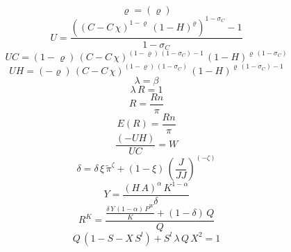 \begin{dmath}
{{\varrho}}=({{\varrho}})
\end{dmath}
\begin{dmath}
{U}=\frac{\left(\left({C}-{C}\, {{\chi}}\right)^{1-{{\varrho}}}\, \left(1-{H}\right)^{{{\varrho}}}\right)^{1-{{\sigma_{C}}}}-1}{1-{{\sigma_{C}}}}
\end{dmath}
\begin{dmath}
{UC}=\left(1-{{\varrho}}\right)\, \left({C}-{C}\, {{\chi}}\right)^{\left(1-{{\varrho}}\right)\, \left(1-{{\sigma_{C}}}\right)-1}\, \left(1-{H}\right)^{{{\varrho}}\, \left(1-{{\sigma_{C}}}\right)}
\end{dmath}
\begin{dmath}
{UH}=\left(-{{\varrho}}\right)\, \left({C}-{C}\, {{\chi}}\right)^{\left(1-{{\varrho}}\right)\, \left(1-{{\sigma_{C}}}\right)}\, \left(1-{H}\right)^{{{\varrho}}\, \left(1-{{\sigma_{C}}}\right)-1}
\end{dmath}
\begin{dmath}
{\lambda}={{\beta}}
\end{dmath}
\begin{dmath}
{\lambda}\, {R}=1
\end{dmath}
\begin{dmath}
{R}=\frac{{Rn}}{{\pi}}
\end{dmath}
\begin{dmath}
{E(R)}=\frac{{Rn}}{{\pi}}
\end{dmath}
\begin{dmath}
\frac{\left(-{UH}\right)}{{UC}}={W}
\end{dmath}
\begin{dmath}
{\delta}={\delta}\, {{\xi}}\, {\tilde{\pi}}^{{{\zeta}}}+\left(1-{{\xi}}\right)\, \left(\frac{{J}}{{JJ}}\right)^{\left(-{{\zeta}}\right)}
\end{dmath}
\begin{dmath}
{Y}=\frac{\left({H}\, {A}\right)^{{{\alpha}}}\, {K}^{1-{{\alpha}}}}{{\delta}}
\end{dmath}
\begin{dmath}
{R^{K}}=\frac{\frac{{\delta}\, {Y}\, \left(1-{{\alpha}}\right)\, {P^{W}}}{{K}}+\left(1-{{\delta}}\right)\, {Q}}{{Q}}
\end{dmath}
\begin{dmath}
{Q}\, \left(1-{S}-{X}\, {S^{l}}\right)+{S^{l}}\, {\lambda}\, {Q}\, {X}^{2}=1
\end{dmath}

